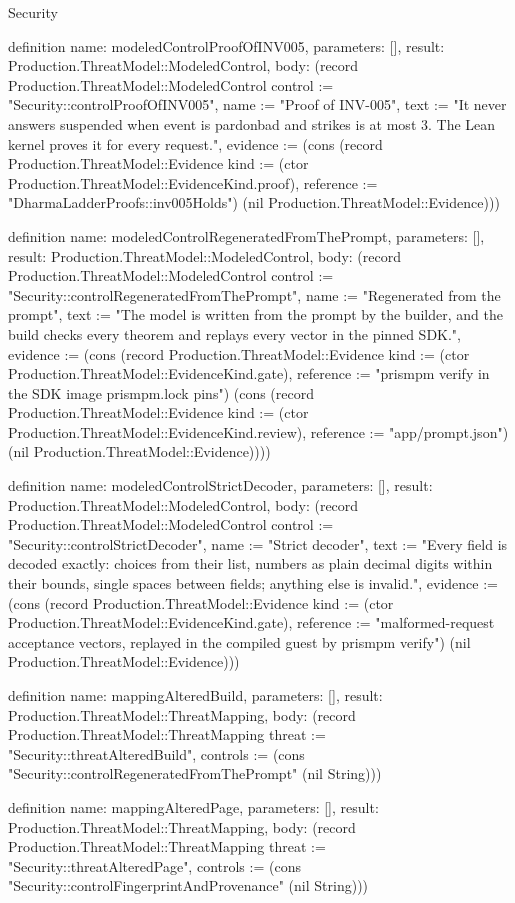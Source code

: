 \begin{lexlean}{Security}
\begin{semanticmodule}
definition{
  name: modeledControlProofOfINV005,
  parameters: [],
  result: Production.ThreatModel::ModeledControl,
  body: (record Production.ThreatModel::ModeledControl {control := "Security::controlProofOfINV005", name := "Proof of INV-005", text := "It never answers suspended when event is pardonbad and strikes is at most 3. The Lean kernel proves it for every request.", evidence := (cons (record Production.ThreatModel::Evidence {kind := (ctor Production.ThreatModel::EvidenceKind.proof), reference := "DharmaLadderProofs::inv005Holds"}) (nil Production.ThreatModel::Evidence))})
}

definition{
  name: modeledControlRegeneratedFromThePrompt,
  parameters: [],
  result: Production.ThreatModel::ModeledControl,
  body: (record Production.ThreatModel::ModeledControl {control := "Security::controlRegeneratedFromThePrompt", name := "Regenerated from the prompt", text := "The model is written from the prompt by the builder, and the build checks every theorem and replays every vector in the pinned SDK.", evidence := (cons (record Production.ThreatModel::Evidence {kind := (ctor Production.ThreatModel::EvidenceKind.gate), reference := "prismpm verify in the SDK image prismpm.lock pins"}) (cons (record Production.ThreatModel::Evidence {kind := (ctor Production.ThreatModel::EvidenceKind.review), reference := "app/prompt.json"}) (nil Production.ThreatModel::Evidence)))})
}

definition{
  name: modeledControlStrictDecoder,
  parameters: [],
  result: Production.ThreatModel::ModeledControl,
  body: (record Production.ThreatModel::ModeledControl {control := "Security::controlStrictDecoder", name := "Strict decoder", text := "Every field is decoded exactly: choices from their list, numbers as plain decimal digits within their bounds, single spaces between fields; anything else is invalid.", evidence := (cons (record Production.ThreatModel::Evidence {kind := (ctor Production.ThreatModel::EvidenceKind.gate), reference := "malformed-request acceptance vectors, replayed in the compiled guest by prismpm verify"}) (nil Production.ThreatModel::Evidence))})
}

definition{
  name: mappingAlteredBuild,
  parameters: [],
  result: Production.ThreatModel::ThreatMapping,
  body: (record Production.ThreatModel::ThreatMapping {threat := "Security::threatAlteredBuild", controls := (cons "Security::controlRegeneratedFromThePrompt" (nil String))})
}

definition{
  name: mappingAlteredPage,
  parameters: [],
  result: Production.ThreatModel::ThreatMapping,
  body: (record Production.ThreatModel::ThreatMapping {threat := "Security::threatAlteredPage", controls := (cons "Security::controlFingerprintAndProvenance" (nil String))})
}


\end{semanticmodule}
\end{lexlean}
